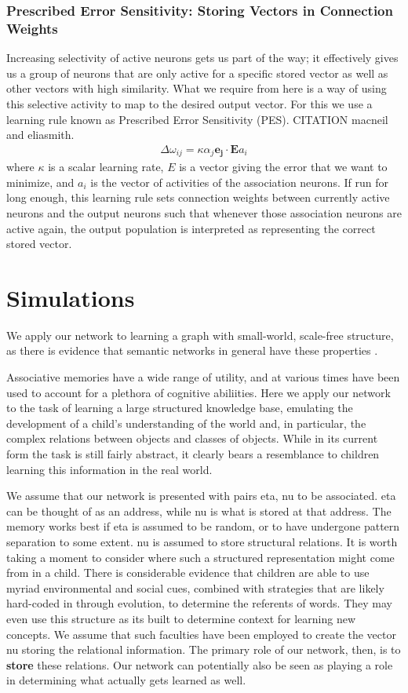 \documentclass[10pt,letterpaper]{article}
\begin{document}
\subsubsection{Prescribed Error Sensitivity: Storing Vectors in Connection Weights}
Increasing selectivity of active neurons gets us part of the way; it effectively gives us a group of neurons that are only active for a specific stored vector as well as other vectors with high similarity. What we require from here is a way of using this selective activity to map to the desired output vector. For this we use a learning rule known as Prescribed Error Sensitivity (PES). CITATION macneil and eliasmith. 
\begin{align}
\Delta \omega_{ij} = \kappa \alpha_j \mathbf{e_j} \cdot \mathbf{E}a_i
\end{align}
where $\kappa$ is a scalar learning rate, $E$ is a vector giving the error that we want to minimize, and $a_i$ is the vector of activities of the association neurons. If run for long enough, this learning rule sets connection weights between currently active neurons and the output neurons such that whenever those association neurons are active again, the output population is interpreted as representing the correct stored vector. 

\section{Simulations}

We apply our network to learning a graph with small-world, scale-free structure, as there is evidence that semantic networks in general have these properties \citep{Tenenbaum2005}.

Associative memories have a wide range of utility, and at various times have been used to account for a plethora of cognitive abiliities. Here we apply our network to the task of learning a large structured knowledge base, emulating the development of a child's understanding of the world and, in particular, the complex relations between objects and classes of objects. While in its current form the task is still fairly abstract, it clearly bears a resemblance to children learning this information in the real world.

We assume that our network is presented with pairs eta, nu to be associated. eta can be thought of as an address, while nu is what is stored at that address. The memory works best if eta is assumed to be random, or to have undergone pattern separation to some extent. nu is assumed to store structural relations. It is worth taking a moment to consider where such a structured representation might come from in a child. There is considerable evidence that children are able to use myriad environmental and social cues, combined with strategies that are likely hard-coded in through evolution, to determine the referents of words. They may even use this structure as its built to determine context for learning new concepts. We assume that such faculties have been employed to create the vector nu storing the relational information. The primary role of our network, then, is to \textbf{store} these relations. Our network can potentially also be seen as playing a role in determining what actually gets learned as well. 
\end{document}

